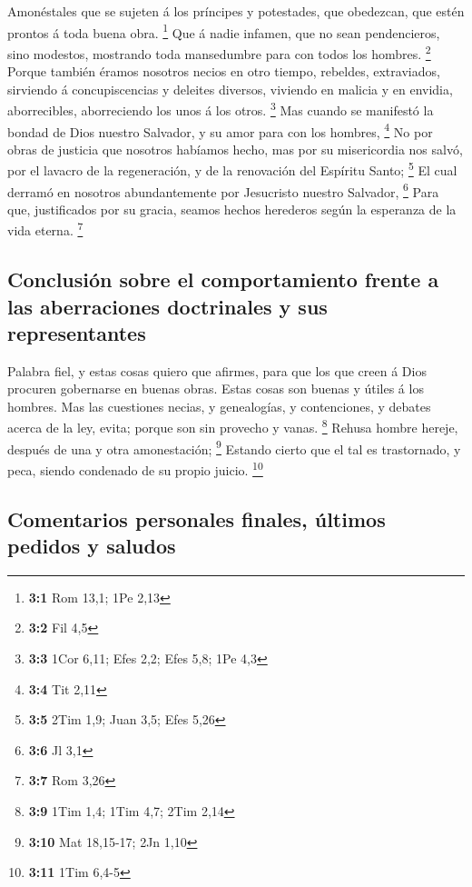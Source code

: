  Amonéstales que se sujeten á los príncipes y potestades,
que obedezcan, que estén prontos á toda buena obra. \footnote{\textbf{3:1}
  Rom 13,1; 1Pe 2,13}  Que á nadie infamen, que no sean
pendencieros, sino modestos, mostrando toda mansedumbre para con todos
los hombres. \footnote{\textbf{3:2} Fil 4,5}  Porque también
éramos nosotros necios en otro tiempo, rebeldes, extraviados, sirviendo
á concupiscencias y deleites diversos, viviendo en malicia y en envidia,
aborrecibles, aborreciendo los unos á los otros. \footnote{\textbf{3:3}
  1Cor 6,11; Efes 2,2; Efes 5,8; 1Pe 4,3}  Mas cuando se
manifestó la bondad de Dios nuestro Salvador, y su amor para con los
hombres, \footnote{\textbf{3:4} Tit 2,11}  No por obras de
justicia que nosotros habíamos hecho, mas por su misericordia nos salvó,
por el lavacro de la regeneración, y de la renovación del Espíritu
Santo; \footnote{\textbf{3:5} 2Tim 1,9; Juan 3,5; Efes 5,26}
 El cual derramó en nosotros abundantemente por Jesucristo
nuestro Salvador, \footnote{\textbf{3:6} Jl 3,1}  Para que,
justificados por su gracia, seamos hechos herederos según la esperanza
de la vida eterna. \footnote{\textbf{3:7} Rom 3,26}

\hypertarget{conclusiuxf3n-sobre-el-comportamiento-frente-a-las-aberraciones-doctrinales-y-sus-representantes}{%
\subsection{Conclusión sobre el comportamiento frente a las aberraciones
doctrinales y sus
representantes}\label{conclusiuxf3n-sobre-el-comportamiento-frente-a-las-aberraciones-doctrinales-y-sus-representantes}}

 Palabra fiel, y estas cosas quiero que afirmes, para que
los que creen á Dios procuren gobernarse en buenas obras. Estas cosas
son buenas y útiles á los hombres.  Mas las cuestiones
necias, y genealogías, y contenciones, y debates acerca de la ley,
evita; porque son sin provecho y vanas. \footnote{\textbf{3:9} 1Tim 1,4;
  1Tim 4,7; 2Tim 2,14}  Rehusa hombre hereje, después de
una y otra amonestación; \footnote{\textbf{3:10} Mat 18,15-17; 2Jn 1,10}
 Estando cierto que el tal es trastornado, y peca, siendo
condenado de su propio juicio. \footnote{\textbf{3:11} 1Tim 6,4-5}

\hypertarget{comentarios-personales-finales-uxfaltimos-pedidos-y-saludos}{%
\subsection{Comentarios personales finales, últimos pedidos y
saludos}\label{comentarios-personales-finales-uxfaltimos-pedidos-y-saludos}}

